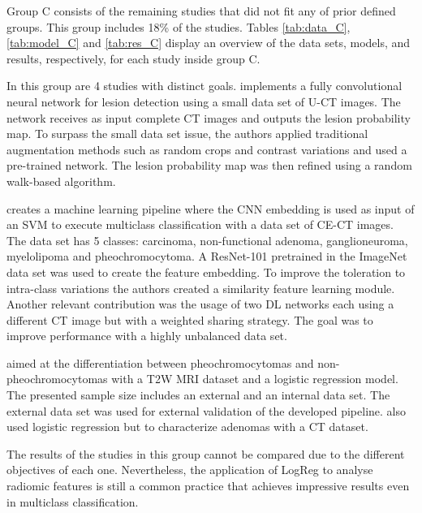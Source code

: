\documentclass{article}
\begin{document}
Group C consists of the remaining studies that did not fit any of prior defined
groups.  This group includes 18\% of the studies. Tables \ref{tab:data_C},
\ref{tab:model_C} and \ref{tab:res_C} display an overview of the data sets,
models, and results, respectively, for each study inside group C.

In this group are 4 studies with distinct goals. \cite{Bi2017} implements a
fully convolutional neural network for lesion detection using a small data set
of U-CT images. The network receives as input complete CT images and outputs the
lesion probability map. To surpass the small data set issue, the authors applied
traditional augmentation methods such as random crops and contrast variations
and used a pre-trained network. The lesion probability map was then refined
using a random walk-based algorithm.

\cite{Bi2022} creates a machine learning pipeline where the CNN embedding is
used as input of an SVM to execute multiclass classification with a data set of
CE-CT images. The data set has 5 classes: carcinoma, non-functional adenoma,
ganglioneuroma, myelolipoma and pheochromocytoma. A ResNet-101 pretrained in the
ImageNet data set was used to create the feature embedding. To improve the
toleration to intra-class variations the authors created a similarity feature
learning module. Another relevant contribution was the usage of two DL networks
each using a different CT image but with a weighted sharing strategy. The goal
was to improve performance with a highly unbalanced data set.

\cite{Kong2022} aimed at the differentiation between pheochromocytomas and
non-pheochromocytomas with a T2W MRI dataset and a logistic regression model.
The presented sample size includes an external and an internal data set. The
external data set was used for external validation of the developed pipeline.
\cite{Zheng2020} also used logistic regression but to characterize adenomas with
a CT dataset.

The results of the studies in this group cannot be compared due to the different
objectives of each one. Nevertheless, the application of LogReg to analyse
radiomic features is still a common practice that achieves impressive results
even in multiclass classification.
\end{document}

